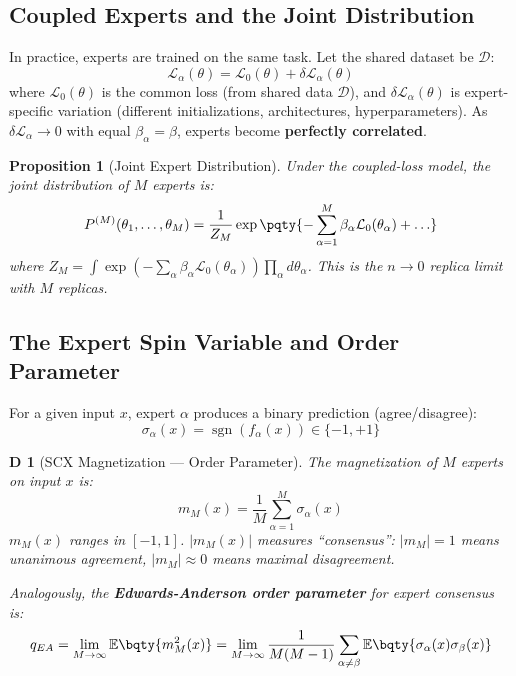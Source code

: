 \documentclass[12pt,a4paper]{article}
\newtheorem{proposition}[theorem]{Proposition}
\newtheorem{definition}[theorem]Definition
\newcommand{\E}{\mathbb{E}}
\newcommand{\D}{\mathcal{D}}
\newcommand{\loss}{\mathcal{L}}
\newcommand{\sgn}{\operatorname{sgn}}
\begin{document}
\subsection{Coupled Experts and the Joint Distribution}
In practice, experts are trained on the same task. Let the shared dataset be \(\D\):
\begin{equation}\label{eq:coupled_loss}
\loss_\alpha(\theta) = \loss_0(\theta) + \delta \loss_\alpha(\theta)
\end{equation}
where \(\loss_0(\theta)\) is the common loss (from shared data \(\D\)), and \(\delta \loss_\alpha(\theta)\) is expert-specific variation (different initializations, architectures, hyperparameters). As \(\delta \loss_\alpha \to 0\) with equal \(\beta_\alpha = \beta\), experts become \textbf{perfectly correlated}.

\begin{proposition}[Joint Expert Distribution]\label{prop:joint}
Under the coupled-loss model, the joint distribution of \(M\) experts is:
\begin{equation}\label{eq:joint_dist}
P^{(M)}(\theta_1, \ldots, \theta_M) = \frac{1}{Z_M} \exp\pqty{-\sum_{\alpha=1}^{M} \beta_\alpha \loss_0(\theta_\alpha) + \ldots}
\end{equation}
where \(Z_M = \int \exp(-\sum_\alpha \beta_\alpha \loss_0(\theta_\alpha)) \prod_\alpha d\theta_\alpha\). This is the \(n \to 0\) replica limit with \(M\) replicas.
\end{proposition}

\subsection{The Expert Spin Variable and Order Parameter}
For a given input \(x\), expert \(\alpha\) produces a binary prediction (agree/disagree):
\begin{equation}\label{eq:expert_spin}
\sigma_\alpha(x) = \sgn(f_\alpha(x)) \in \{-1, +1\}
\end{equation}

\begin{definition}[SCX Magnetization --- Order Parameter]
The magnetization of \(M\) experts on input \(x\) is:
\begin{equation}\label{eq:order_param}
m_M(x) = \frac{1}{M} \sum_{\alpha=1}^{M} \sigma_\alpha(x)
\end{equation}
\(m_M(x)\) ranges in \([-1, 1]\). \(|m_M(x)|\) measures ``consensus'': \(|m_M| = 1\) means unanimous agreement, \(|m_M| \approx 0\) means maximal disagreement.

Analogously, the \textbf{Edwards-Anderson order parameter} for expert consensus is:
\begin{equation}\label{eq:ea_order}
q_{EA} = \lim_{M\to\infty} \E\bqty{m_M^2(x)} = \lim_{M\to\infty} \frac{1}{M(M-1)} \sum_{\alpha \neq \beta} \E\bqty{\sigma_\alpha(x) \sigma_\beta(x)}
\end{equation}
\end{definition}
\end{document}
